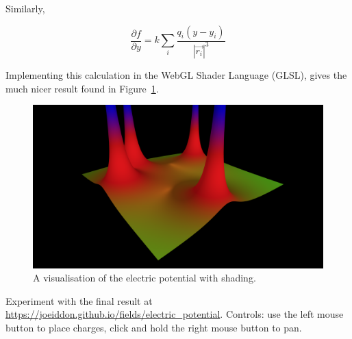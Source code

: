 \documentclass{article} %
\begin{document}
Similarly,

$$\frac{\partial f}{\partial y} = k\sum_{i}\frac{q_i(y-y_i)}{|\vec{r_i}|^3}$$

Implementing this calculation in the WebGL Shader Language (GLSL), gives the much nicer result found in Figure~\ref{fig:shading}.

\begin{figure}
\includegraphics[width=\linewidth]{shading.png}
\caption{A visualisation of the electric potential with shading.}
\label{fig:shading}
\end{figure}

\vfill
Experiment with the final result at \url{https://joeiddon.github.io/fields/electric_potential}. Controls: use the left mouse button to place charges, click and hold the right mouse button to pan.
\end{document}
